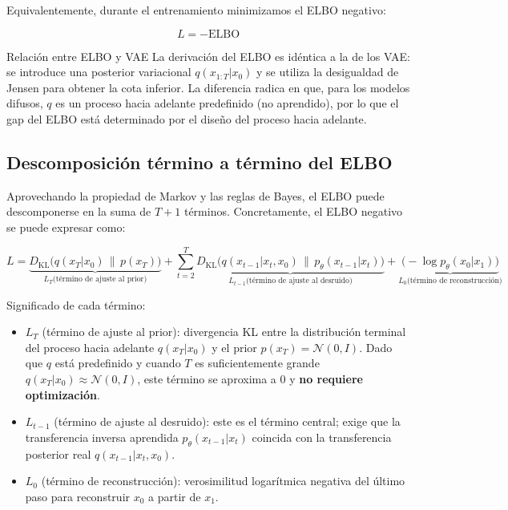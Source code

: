 \documentclass[a4paper]{article}
\begin{document}
Equivalentemente, durante el entrenamiento minimizamos el ELBO negativo:

$$L = -\text{ELBO}$$

\begin{knowledgebox}{Relación entre ELBO y VAE}
La derivación del ELBO es idéntica a la de los VAE: se introduce una posterior variacional $q(x_{1:T}|x_0)$ y se utiliza la desigualdad de Jensen para obtener la cota inferior. La diferencia radica en que, para los modelos difusos, $q$ es un proceso hacia adelante predefinido (no aprendido), por lo que el gap del ELBO está determinado por el diseño del proceso hacia adelante.
\end{knowledgebox}

\subsection{Descomposición término a término del ELBO}

Aprovechando la propiedad de Markov y las reglas de Bayes, el ELBO puede descomponerse en la suma de $T+1$ términos. Concretamente, el ELBO negativo se puede expresar como:

$$L = \underbrace{D_{\text{KL}}\big(q(x_T|x_0) \,\|\, p(x_T)\big)}_{L_T\text{(término de ajuste al prior)}} + \sum_{t=2}^{T} \underbrace{D_{\text{KL}}\big(q(x_{t-1}|x_t, x_0) \,\|\, p_\theta(x_{t-1}|x_t)\big)}_{L_{t-1}\text{(término de ajuste al desruido)}} + \underbrace{\big(-\log p_\theta(x_0|x_1)\big)}_{L_0\text{(término de reconstrucción)}}$$

Significado de cada término:
\begin{itemize}
    \item $L_T$ (término de ajuste al prior): divergencia KL entre la distribución terminal del proceso hacia adelante $q(x_T|x_0)$ y el prior $p(x_T) = \mathcal{N}(0,I)$. Dado que $q$ está predefinido y cuando $T$ es suficientemente grande $q(x_T|x_0) \approx \mathcal{N}(0,I)$, este término se aproxima a 0 y \textbf{no requiere optimización}.
    \item $L_{t-1}$ (término de ajuste al desruido): este es el término central; exige que la transferencia inversa aprendida $p_\theta(x_{t-1}|x_t)$ coincida con la transferencia posterior real $q(x_{t-1}|x_t, x_0)$.
    \item $L_0$ (término de reconstrucción): verosimilitud logarítmica negativa del último paso para reconstruir $x_0$ a partir de $x_1$.
\end{itemize}
\end{document}
